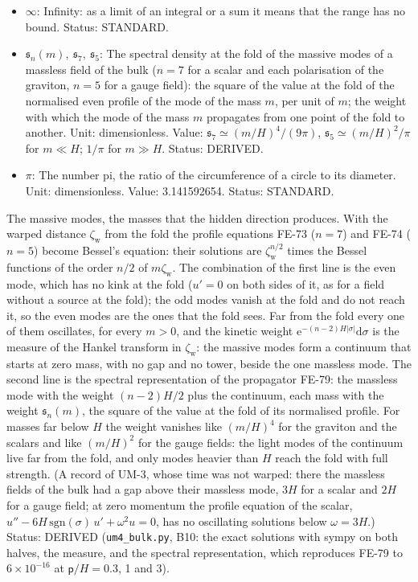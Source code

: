\documentclass[
  10pt,
]{article}
\begin{document}
\begin{itemize}
  differentials. Status: STANDARD.
\item
  \(\infty\): Infinity: as a limit of an integral or a sum it means that
  the range has no bound. Status: STANDARD.
\item
  \(\mathfrak{s}_n(m),\ \mathfrak{s}_7,\ \mathfrak{s}_5\): The spectral
  density at the fold of the massive modes of a massless field of the
  bulk (\(n = 7\) for a scalar and each polarisation of the graviton,
  \(n = 5\) for a gauge field): the square of the value at the fold of
  the normalised even profile of the mode of the mass \(m\), per unit of
  \(m\); the weight with which the mode of the mass \(m\) propagates
  from one point of the fold to another. Unit: dimensionless. Value:
  \(\mathfrak{s}_7 \simeq (m/H)^4/(9\pi)\),
  \(\mathfrak{s}_5 \simeq (m/H)^2/\pi\) for \(m \ll H\); \(1/\pi\) for
  \(m \gg H\). Status: DERIVED.
\item
  \(\pi\): The number pi, the ratio of the circumference of a circle to
  its diameter. Unit: dimensionless. Value: 3.141592654. Status:
  STANDARD.
\end{itemize}

The massive modes, the masses that the hidden direction produces. With
the warped distance \(\zeta_{\mathrm{w}}\) from the fold the profile
equations FE-73 (\(n = 7\)) and FE-74 (\(n = 5\)) become Bessel's
equation: their solutions are \(\zeta_{\mathrm{w}}^{n/2}\) times the
Bessel functions of the order \(n/2\) of \(m\zeta_{\mathrm{w}}\). The
combination of the first line is the even mode, which has no kink at the
fold (\(u' = 0\) on both sides of it, as for a field without a source at
the fold); the odd modes vanish at the fold and do not reach it, so the
even modes are the ones that the fold sees. Far from the fold every one
of them oscillates, for every \(m > 0\), and the kinetic weight
\(\mathrm{e}^{-(n-2)H\lvert\sigma\rvert}\mathrm{d}\sigma\) is the
measure of the Hankel transform in \(\zeta_{\mathrm{w}}\): the massive
modes form a continuum that starts at zero mass, with no gap and no
tower, beside the one massless mode. The second line is the spectral
representation of the propagator FE-79: the massless mode with the
weight \((n - 2)H/2\) plus the continuum, each mass with the weight
\(\mathfrak{s}_n(m)\), the square of the value at the fold of its
normalised profile. For masses far below \(H\) the weight vanishes like
\((m/H)^4\) for the graviton and the scalars and like \((m/H)^2\) for
the gauge fields: the light modes of the continuum live far from the
fold, and only modes heavier than \(H\) reach the fold with full
strength. (A record of UM-3, whose time was not warped: there the
massless fields of the bulk had a gap above their massless mode, \(3H\)
for a scalar and \(2H\) for a gauge field; at zero momentum the profile
equation of the scalar,
\(u'' - 6H\,\mathrm{sgn}(\sigma)\,u' + \omega^2u = 0\), has no
oscillating solutions below \(\omega = 3H\).) Status: DERIVED
(\texttt{um4\_bulk.py}, B10: the exact solutions with sympy on both
halves, the measure, and the spectral representation, which reproduces
FE-79 to \(6\times10^{-16}\) at \(\mathsf{p}/H = 0.3\), 1 and 3).
\end{document}
